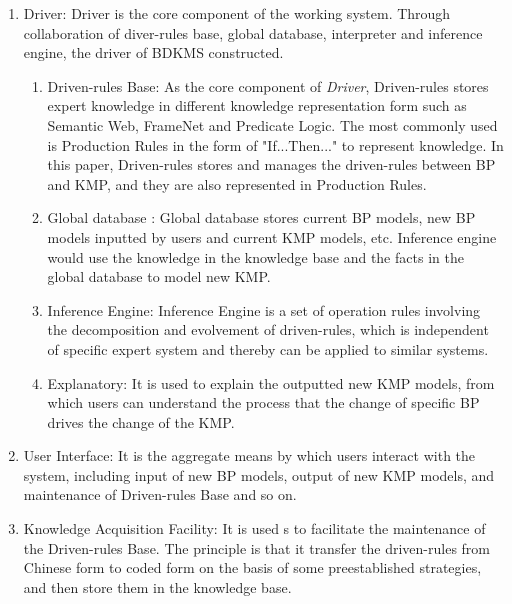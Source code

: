 \documentclass{elsarticle}
\begin{document}
  \begin{enumerate}
  \item Driver: Driver is the core component of the working
system\cite{curtis2005business}. Through collaboration of diver-rules base, global database,
interpreter and inference engine, the driver of
BDKMS constructed.
  \begin{enumerate}
\item 
\textrm{Driven-rules Base: As the core component of
}\textrm{\textit{Driver}}\textrm{, Driven-rules stores expert knowledge
in different knowledge representation form such as Semantic Web,
FrameNet and Predicate Logic. The most commonly used is Production
Rules in the form of "If...Then..." to
represent knowledge\cite{huang2009designing}. In this paper, Driven-rules stores and manages the
driven-rules between BP and }\textrm{KMP, and they are also represented
in Production Rules.}
\item 
\textrm{Global database : Global database stores current BP models, new
BP models inputted by users and current KMP models, etc. Inference
engine would use the knowledge in the knowledge base and the facts in
the global database to model new KMP.}
\item 
\textrm{Inference Engine: Inference Engine is a set of operation rules
involving the decomposition and evolvement of driven-rules, which is
independent of specific expert system and thereby can be applied to
similar systems.}
\item 
\textrm{Explanatory: It is used to explain the outputted new KMP models,
from which users can understand the process that the change of 
specific BP drives the change of the KMP.}
\end{enumerate}
\item User Interface: It is the
aggregate means by which users interact with the system, including
input of new BP models, output of new KMP models, and maintenance of
Driven-rules Base and so on.
\item Knowledge Acquisition Facility: It is used
s to facilitate the maintenance of the Driven-rules Base. The
principle is that it transfer the driven-rules from
Chinese form to coded form on the
basis of some preestablished strategies, and then store them in the
knowledge base.
  \end{enumerate}
\end{document}

